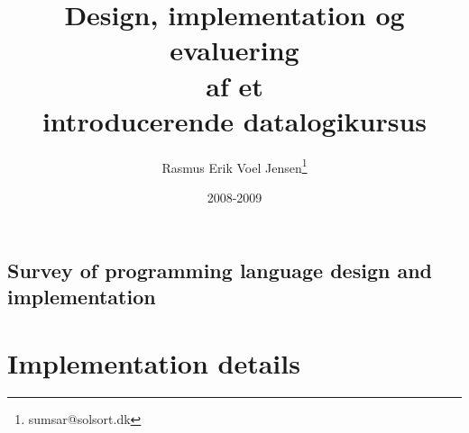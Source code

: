 \documentclass[12pt]{report}
\title{Design, implementation og evaluering \\ af et \\ introducerende datalogikursus}
\author{
  Rasmus Erik Voel Jensen\footnote{
    sumsar@solsort.dk
  }
}
\date{2008-2009}
\begin{document}

\maketitle

\setcounter{tocdepth}{1}
\tableofcontents
\listoffigures


\chapter{Survey of programming language design and implementation}

\part{Implementation details}

\newpage
{}



\appendix

\newpage
{}
\printindex
\end{document}
